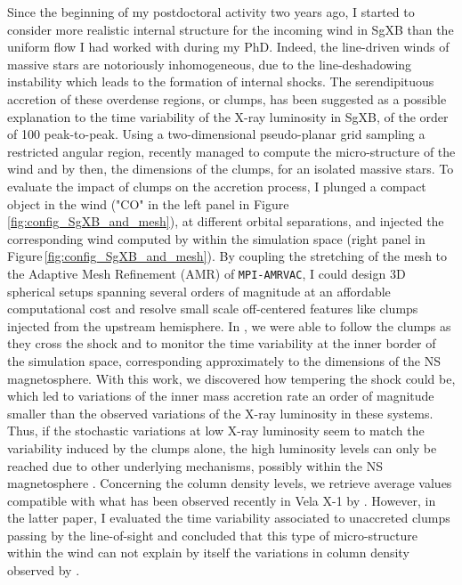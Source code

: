 \documentclass[a4paper,12pt,onecolumn]{article}
\begin{document}
\indent Since the beginning of my postdoctoral activity two years ago, I started to consider more realistic internal structure for the incoming wind in SgXB than the uniform flow I had worked with during my PhD. Indeed, the line-driven winds of massive stars are notoriously inhomogeneous, due to the line-deshadowing instability \citep{Owocki1984a} which leads to the formation of internal shocks. The serendipituous accretion of these overdense regions, or clumps, has been suggested as a possible explanation to the time variability of the X-ray luminosity in SgXB, of the order of 100 peak-to-peak. Using a two-dimensional pseudo-planar grid sampling a restricted angular region, \cite{Sundqvist2017} recently managed to compute the micro-structure of the wind and by then, the dimensions of the clumps, for an isolated massive stars. To evaluate the impact of clumps on the accretion process, I plunged a compact object in the wind ("CO" in the left panel in Figure\,\ref{fig:config_SgXB_and_mesh}), at different orbital separations, and injected the corresponding wind computed by \cite{Sundqvist2017} within the simulation space (right panel in Figure\,\ref{fig:config_SgXB_and_mesh}). By coupling the stretching of the mesh to the Adaptive Mesh Refinement (AMR) of \texttt{MPI-AMRVAC}, I could design 3D spherical setups spanning several orders of magnitude at an affordable computational cost and resolve small scale off-centered features like clumps injected from the upstream hemisphere. In \cite{ElMellah}, we were able to follow the clumps as they cross the shock and to monitor the time variability at the inner border of the simulation space, corresponding approximately to the dimensions of the NS magnetosphere. With this work, we discovered how tempering the shock could be, which led to variations of the inner mass accretion rate an order of magnitude smaller than the observed variations of the X-ray luminosity in these systems. Thus, if the stochastic variations at low X-ray luminosity seem to match the variability induced by the clumps alone, the high luminosity levels can only be reached due to other underlying mechanisms, possibly within the NS magnetosphere \citep[eg the propeller effect,][]{Bozzo2016}. Concerning the column density levels, we retrieve average values compatible with what has been observed recently in Vela X-1 by \cite{Grinberg2017}. However, in the latter paper, I evaluated the time variability associated to unaccreted clumps passing by the line-of-sight and concluded that this type of micro-structure within the wind can not explain by itself the variations in column density observed by \cite{Grinberg2017}.\\ \\
\end{document}

